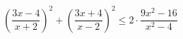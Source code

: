 \begin{ex}[type=inequality]
	\begin{condition}
		\( \left( \dfrac{3x-4}{x+2} \right)^2+\left( \dfrac{3x+4}{x-2} \right)^2\le 2\cdot\dfrac{9x^2-16}{x^2-4} \)
	\end{condition}
\end{ex}